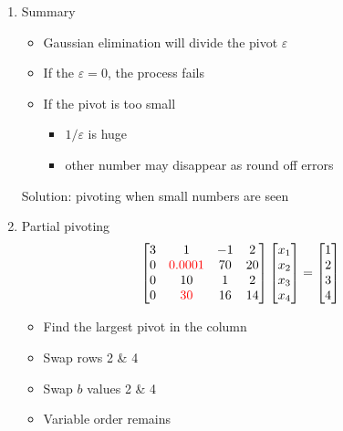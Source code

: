 \documentclass{article}
\theoremstyle{remark}
\begin{document}
\begin{enumerate}
\begin{enumerate}
\item Summary
\begin{itemize}
\item Gaussian elimination will divide the pivot $\varepsilon$
\item If the $\varepsilon  = 0$, the process fails
\item If the pivot is too small
\begin{itemize}
\item $1/\varepsilon$ is huge
\item other number may disappear as round off errors
\end{itemize}
\end{itemize}
Solution: pivoting when small numbers are seen

\item Partial pivoting
$$
\begin{bmatrix}
3 & 1 & -1 & 2\\
0 & {\color{red}0.0001} & 70 & 20 \\
0 & 10 & 1 & 2\\
0 & {\color{red}30} & 16 & 14
\end{bmatrix} \begin{bmatrix}
x_1\\x_2\\x_3\\x_4
\end{bmatrix} = \begin{bmatrix}
1\\2\\3\\4
\end{bmatrix}
$$
\begin{itemize}
\item Find the largest pivot in the column
\item Swap rows 2 \& 4
\item Swap $b$ values 2 \& 4
\item Variable order remains
\end{itemize}


\end{enumerate}
\end{enumerate}
\end{document}
